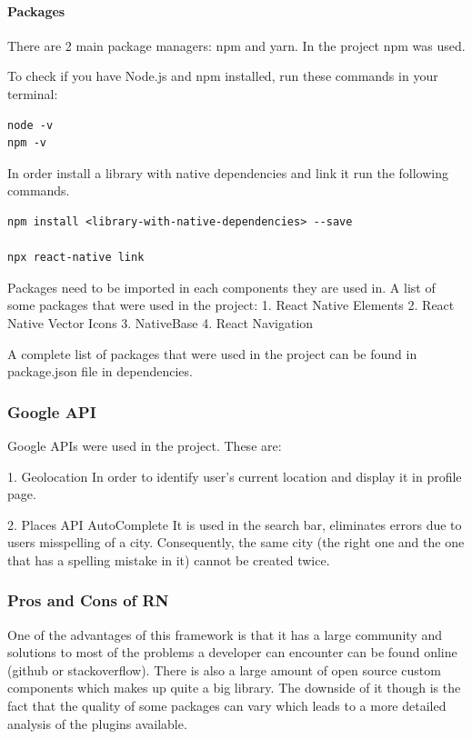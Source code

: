 \paragraph{Packages}
There are 2 main package managers: npm and yarn.
In the project npm was used.

To check if you have Node.js and npm installed, run these commands in your terminal:

\begin{lstlisting}
node -v
npm -v
\end{lstlisting}

In order install a library with native dependencies and link it run the following commands.

\begin{lstlisting}
npm install <library-with-native-dependencies> --save

npx react-native link
\end{lstlisting}

Packages need to be imported in each components they are used in.
A list of some packages that were used in the project:
 1. React Native Elements 
 2. React Native Vector Icons
 3. NativeBase
 4. React Navigation
 
 A complete list of packages that were used in the project can be found in package.json file in dependencies.
 
 \subsubsection{Google API}
 \indent
  Google APIs were used in the project. These are:
 
   1. Geolocation
   In order to identify user's current location and display it in profile page.
   
   2. Places API AutoComplete
   It is used in the search bar, eliminates  errors due to users misspelling of a city.
   Consequently, the same city (the right one and the one that has a spelling mistake in it) cannot be created twice.

 
 \subsubsection{Pros and Cons of RN}
 \indent
 \indent
One of the advantages of this framework is that it has a large community and solutions to most of the problems a developer can encounter can be found online (github or stackoverflow).
There is also a large amount of open source custom components which makes up quite a big library. The downside of it though is the fact that the quality of some packages can vary which leads to a more detailed analysis of the plugins available.

